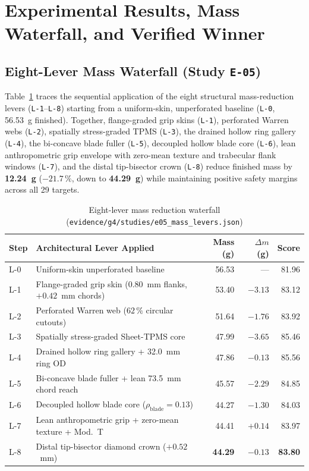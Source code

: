 \documentclass[10pt,journal,letterpaper]{IEEEtran}
\DeclareRobustCommand{\code}[1]{\texorpdfstring{{\nolinkurl{#1}}}{#1}}
\begin{document}
\section{Experimental Results, Mass Waterfall, and Verified Winner}\label{sec:results}
\subsection{Eight-Lever Mass Waterfall (Study \code{E-05})}
Table~\ref{tab:waterfall} traces the sequential application of the eight structural mass-reduction levers (\code{L-1}--\code{L-8})
starting from a uniform-skin, unperforated baseline (\code{L-0}, 56.53~g finished). Together, flange-graded grip skins (\code{L-1}),
perforated Warren webs (\code{L-2}), spatially stress-graded TPMS (\code{L-3}), the drained hollow ring gallery (\code{L-4}), the bi-concave
blade fuller (\code{L-5}), decoupled hollow blade core (\code{L-6}), lean anthropometric grip envelope with zero-mean texture and
trabecular flank windows (\code{L-7}), and the distal tip-bisector crown (\code{L-8}) reduce finished mass by \textbf{12.24~g}
($-21.7\,\%$, down to \textbf{44.29~g}) while maintaining positive safety margins across all 29 targets.

\begin{table}[t]
\caption{Eight-lever mass reduction waterfall (\code{evidence/g4/studies/e05\_mass\_levers.json})}\label{tab:waterfall}
\centering
\setlength{\tabcolsep}{3.5pt}
\begin{tabular}{@{}llrrr@{}}
\toprule
Step & Architectural Lever Applied & Mass (g) & $\Delta m$ (g) & Score \\
\midrule
L-0 & Uniform-skin unperforated baseline & 56.53 & --- & 81.96 \\
L-1 & Flange-graded grip skin ($0.80$~mm flanks, $+0.42$~mm chords) & 53.40 & $-3.13$ & 83.12 \\
L-2 & Perforated Warren web ($62\,\%$ circular cutouts) & 51.64 & $-1.76$ & 83.92 \\
L-3 & Spatially stress-graded Sheet-TPMS core & 47.99 & $-3.65$ & 85.46 \\
L-4 & Drained hollow ring gallery + 32.0~mm ring OD & 47.86 & $-0.13$ & 85.56 \\
L-5 & Bi-concave blade fuller + lean 73.5~mm chord reach & 45.57 & $-2.29$ & 84.85 \\
L-6 & Decoupled hollow blade core ($\rho_{\mathrm{blade}}=0.13$) & 44.27 & $-1.30$ & 84.03 \\
L-7 & Lean anthropometric grip + zero-mean texture + Mod.\ T & 44.41 & $+0.14$ & 83.97 \\
L-8 & Distal tip-bisector diamond crown ($+0.52$~mm) & \textbf{44.29} & $-0.13$ & \textbf{83.80} \\
\bottomrule
\end{tabular}
\end{table}
\end{document}
